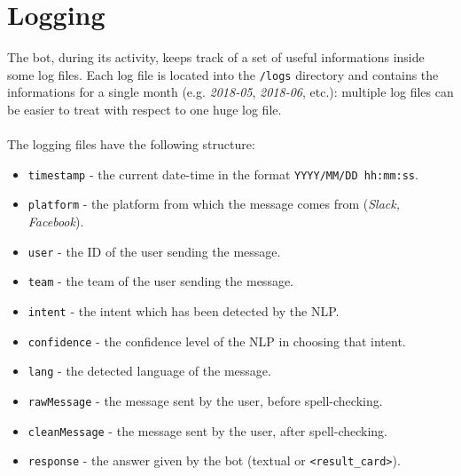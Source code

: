 	\section{Logging}
	The bot, during its activity, keeps track of a set of useful informations inside some log files. Each log file is located into the \texttt{/logs} directory and contains the informations for a single month (e.g. \textit{2018-05}, \textit{2018-06}, etc.): multiple log files can be easier to treat with respect to one huge log file.\\\\
	The logging files have the following structure:
	\begin{itemize}
		\item \texttt{timestamp} - the current date-time in the format \texttt{YYYY/MM/DD hh:mm:ss}.
		\item \texttt{platform} - the platform from which the message comes from (\textit{Slack, Facebook}).
		\item \texttt{user} - the ID of the user sending the message.
		\item \texttt{team} - the team of the user sending the message.
		\item \texttt{intent} - the intent which has been detected by the NLP.
		\item \texttt{confidence} - the confidence level of the NLP in choosing that intent.
		\item \texttt{lang} - the detected language of the message.
		\item \texttt{rawMessage} - the message sent by the user, before spell-checking.
		\item \texttt{cleanMessage} - the message sent by the user, after spell-checking.
		\item \texttt{response} - the answer given by the bot (textual or \texttt{<result\_card>}).
	\end{itemize}